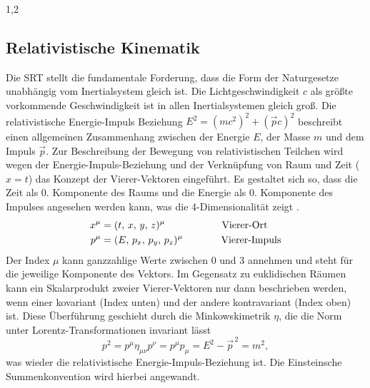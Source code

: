 \documentclass[11pt,a4paper,twoside,draft]{report}
\begin{document}
\begin{spacing}{1,2}
\subsection{Relativistische Kinematik}
Die SRT stellt die fundamentale Forderung, dass die Form der Naturgesetze unabhängig vom Inertialsystem gleich ist. Die Lichtgeschwindigkeit $c$ als
größte vorkommende Geschwindigkeit ist in allen Inertialsystemen gleich groß. Die relativistische Energie-Impuls Beziehung 
$E^2 = \left(mc^2\right)^2 + \left(\vec pc\right)^2$ beschreibt einen allgemeinen Zusammenhang zwischen der Energie $E$, der Masse $m$ und dem Impuls $\vec p$.
% 
\noindent
Zur Beschreibung der Bewegung von relativistischen Teilchen wird wegen der Energie-Impuls-Beziehung und der Verknüpfung von Raum und Zeit ($x = t$) das Konzept
der Vierer-Vektoren eingeführt. Es gestaltet sich so, dass die Zeit als 0. Komponente des Raums und die Energie als 0. Komponente des Impulses angesehen werden
kann, was die 4-Dimensionalität zeigt \cite{RelKin}.
\begin{align}
 x^\mu &= (t,\,x,\,y,\,z)^\mu \hspace{2cm} \text{Vierer-Ort}\\
 p^\mu &= (E,\,p_x,\,p_y,\,p_z)^\mu \hspace{1.35cm} \text{Vierer-Impuls}
\end{align}
Der Index $\mu$ kann ganzzahlige Werte zwischen 0 und 3 annehmen und steht für die jeweilige Komponente des Vektors. Im Gegensatz zu euklidischen Räumen 
kann ein Skalarprodukt zweier Vierer-Vektoren nur dann beschrieben werden, wenn einer kovariant (Index unten) und der andere kontravariant (Index oben) ist.
Diese Überführung geschieht durch die Minkowskimetrik $\eta$, die die Norm unter Lorentz-Transformationen invariant lässt
\begin{equation}
  p^2 = p^\mu \eta_{\mu \nu} p^\nu = p^\mu p_\mu = E^2 - \vec{p}^{\,2} = m^2,
\end{equation}
was wieder die relativistische Energie-Impuls-Beziehung ist. Die Einsteinsche Summenkonvention wird hierbei angewandt.

\end{spacing}
\end{document}
